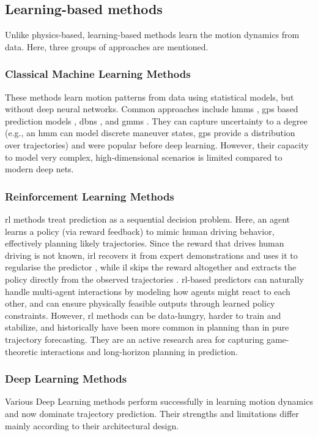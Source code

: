 \subsection{Learning-based methods}
\label{subsec:sota-learning}

Unlike physics-based, learning-based methods learn the motion dynamics from data.
Here, three groups of approaches are mentioned. 

\subsubsection{Classical Machine Learning Methods}
\label{subsec:sota-classical-ml}
These methods learn motion patterns from data using statistical models, but without deep
neural networks. Common approaches include \acp{hmm} \cite{Deo2018Maneuver}, \acp{gp} based prediction
models \cite{Wang2008GPDM}, \acp{dbn} \cite{Li2020Pedestrian},
and \acp{gmm} \cite{Wiest2012GMM}. They can capture
uncertainty to a degree (e.g., an \ac{hmm} can model discrete maneuver states, \acp{gp}
provide a distribution over trajectories) and were popular before deep learning. However, their
capacity to model very complex, high-dimensional scenarios is limited compared to modern
deep nets.

\subsubsection{Reinforcement Learning Methods}
\label{subsec:sota-rl}

\Ac{rl} methods treat prediction as a sequential decision problem. Here, an agent learns a
policy (via reward feedback) to mimic human driving behavior, effectively planning likely
trajectories. Since the reward that drives human driving is not known, \ac{irl}
recovers it from expert demonstrations and uses it to regularise the predictor \cite{Choi2020IRL}, while
\ac{il} skips the reward altogether and extracts the policy directly from the observed
trajectories \cite{Qi2020Imitative}. \Ac{rl}-based predictors can naturally handle multi-agent interactions by
modeling how agents might react to each other, and can ensure physically feasible outputs through learned
policy constraints. However, \ac{rl} methods can be data-hungry, harder to train and stabilize, and
historically have been more common in planning than in pure trajectory forecasting. They are
an active research area for capturing game-theoretic interactions and long-horizon planning in
prediction.

\subsubsection{Deep Learning Methods}
\label{subsec:sota-dl}
Various Deep Learning methods perform successfully in learning motion dynamics and now dominate trajectory
prediction. Their strengths and limitations differ mainly according to their architectural design.



